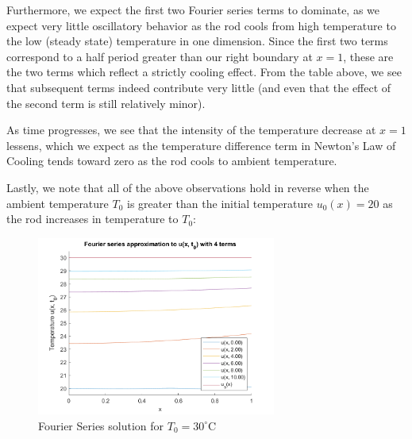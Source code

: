 \begin{solution}
    Furthermore, we expect the first two Fourier series terms to dominate, as we expect very little oscillatory
    behavior as the rod cools from high temperature to the low (steady state) temperature in one dimension. 
    Since the first two terms correspond to a half period greater than our right boundary at $x = 1$, these are
    the two terms which reflect a strictly cooling effect. From the table above, we see that subsequent terms 
    indeed contribute very little (and even that the effect of the second term is still relatively minor).
    
    As time progresses, we see that the intensity of the temperature decrease at $x = 1$ lessens, which we expect
    as the temperature difference term in Newton's Law of Cooling tends toward zero as the rod cools to ambient 
    temperature.

    \pagebreak
    Lastly, we note that all of the above observations hold in reverse when the ambient temperature $T_0$ is 
    greater than the initial temperature $u_0(x) = 20$ as the rod increases in temperature to $T_0$:

    \begin{figure}[h]
        \centering
        \includegraphics[width=0.7\textwidth]{problem1_fourier_series_solution_4_terms_t0_30.png}
        \caption{Fourier Series solution for $T_0 = 30^{\circ}$C}
    \end{figure}

\end{solution}